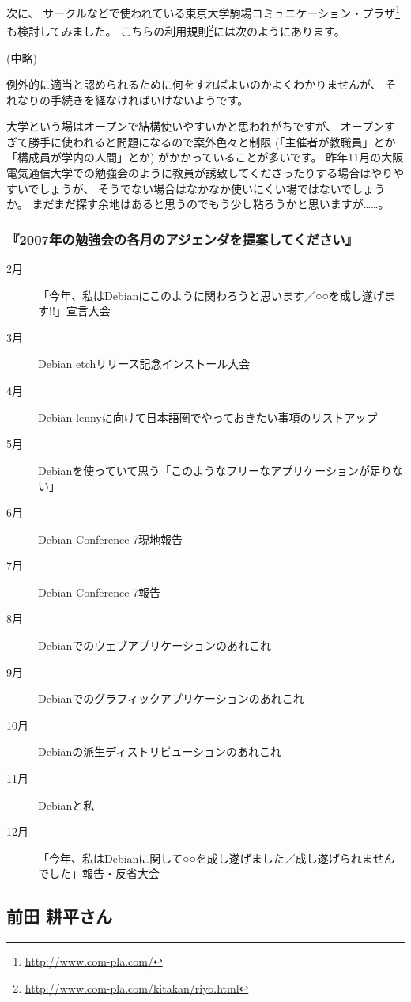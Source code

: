 \documentclass[mingoth,a4paper,twoside]{jsarticle}
\begin{document}
次に、
サークルなどで使われている東京大学駒場コミュニケーション・プラザ\footnote{\url{http://www.com-pla.com/}}も検討してみました。
こちらの利用規則\footnote{\url{http://www.com-pla.com/kitakan/riyo.html}}には次のようにあります。

(中略)

例外的に適当と認められるために何をすればよいのかよくわかりませんが、
それなりの手続きを経なければいけないようです。

大学という場はオープンで結構使いやすいかと思われがちですが、
オープンすぎて勝手に使われると問題になるので案外色々と制限 (「主催者が教職員」とか「構成員が学内の人間」とか) がかかっていることが多いです。
昨年11月の大阪電気通信大学での勉強会のように教員が誘致してくださったりする場合はやりやすいでしょうが、
そうでない場合はなかなか使いにくい場ではないでしょうか。
まだまだ探す余地はあると思うのでもう少し粘ろうかと思いますが……。

\subsubsection{『2007年の勉強会の各月のアジェンダを提案してください』}

{\small
\begin{description}
 \item[2月] 「今年、私はDebianにこのように関わろうと思います／○○を成し遂げます!!」宣言大会
 \item[3月] Debian etchリリース記念インストール大会
 \item[4月] Debian lennyに向けて日本語圏でやっておきたい事項のリストアップ
 \item[5月] Debianを使っていて思う「このようなフリーなアプリケーションが足りない」
 \item[6月] Debian Conference 7現地報告
 \item[7月] Debian Conference 7報告
 \item[8月] Debianでのウェブアプリケーションのあれこれ
 \item[9月] Debianでのグラフィックアプリケーションのあれこれ
 \item[10月] Debianの派生ディストリビューションのあれこれ
 \item[11月] Debianと私
 \item[12月] 「今年、私はDebianに関して○○を成し遂げました／成し遂げられませんでした」報告・反省大会
\end{description}
}

\subsection{前田 耕平さん}
\end{document}
